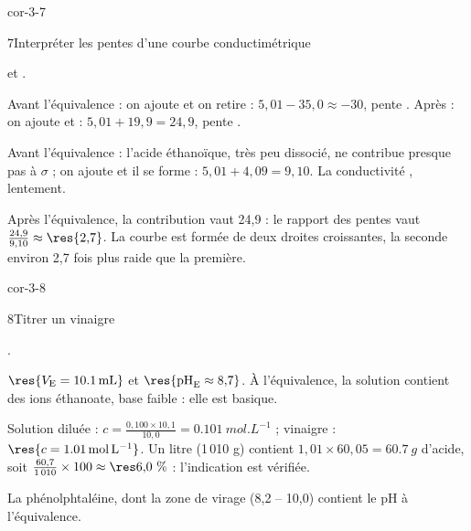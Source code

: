 \begin{blocLivre}{cor-3-7}
\begin{corrige}{7}{Interpréter les pentes d'une courbe conductimétrique}
\begin{questions}
\item {} et .
\item Avant l'équivalence : on ajoute  et on retire  : $5{,}01-35{,}0\approx-30$, pente
. Après : on ajoute  et  : $5{,}01+19{,}9=24{,}9$, pente .
\item Avant l'équivalence : l'acide éthanoïque, très peu dissocié, ne contribue presque pas à $\sigma$ ; on ajoute 
et il se forme  : $5{,}01+4{,}09=9{,}10$. La conductivité , lentement.
\item Après l'équivalence, la contribution vaut 24,9 : le rapport des pentes vaut $\frac{24{,}9}{9{,}10}\approx\res{2{,}7}$.
La courbe est formée de deux droites croissantes, la seconde environ 2,7 fois plus raide que la première.
\end{questions}
\end{corrige}
\end{blocLivre}
\begin{blocLivre}{cor-3-8}
\begin{corrige}{8}{Titrer un vinaigre}
\begin{questions}
\item {}.
\item $\res{V_\mathrm{E}=\qty{10,1}{mL}}$ et $\res{\pH_\mathrm{E}\approx8{,}7}$. À l'équivalence, la solution contient des
ions éthanoate, base faible : elle est basique.
\item Solution diluée : $c=\frac{0{,}100\times10{,}1}{10{,}0}=\qty{0,101}{mol.L^{-1}}$ ; vinaigre :
$\res{c=\qty{1,01}{mol.L^{-1}}}$. Un litre (1\,010 g) contient $1{,}01\times60{,}05=\qty{60,7}{g}$ d'acide, soit
$\frac{60{,}7}{1\,010}\times100\approx\res{6{,}0~\%}$ : l'indication est vérifiée.
\item La phénolphtaléine, dont la zone de virage (8,2 -- 10,0) contient le pH à l'équivalence.
\end{questions}
\end{corrige}
\end{blocLivre}
